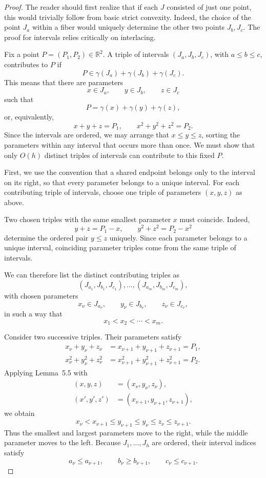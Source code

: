 \documentclass{amsart}
\numberwithin{equation}{section}
\begin{document}
\begin{proof}
The reader should first realize that if each $J$ consisted of just one point, this would trivially follow from basic strict convexity. Indeed, the choice of the point $J_a$ within a fiber would uniquely determine the other two points $J_b,J_c$. The proof for intervals relies critically on interlacing.

Fix a point $P=(P_1,P_2)\in\mathbb{R}^2$. A triple of intervals
$(J_a,J_b,J_c)$, with $a\le b\le c$, contributes to $P$ if
\[
    P\in\gamma(J_a)+\gamma(J_b)+\gamma(J_c).
\]
This means that there are parameters
\[
    x\in J_a,\qquad y\in J_b,\qquad z\in J_c
\]
such that
\[
    P=\gamma(x)+\gamma(y)+\gamma(z),
\]
or, equivalently,
\[
    x+y+z=P_1,\qquad x^2+y^2+z^2=P_2.
\]
Since the intervals are ordered, we may arrange that $x\le y\le z$,
sorting the parameters within any interval that occurs more than once.
We must show that only $O(h)$ distinct triples of intervals can
contribute to this fixed $P$.

First, we use the convention that a shared endpoint belongs only to the
interval on its right, so that every parameter belongs to a unique
interval. For each contributing triple of intervals, choose one triple
of parameters $(x,y,z)$ as above.

Two chosen triples with the same smallest parameter $x$ must coincide.
Indeed,
\[
    y+z=P_1-x,\qquad y^2+z^2=P_2-x^2
\]
determine the ordered pair $y\le z$ uniquely. Since each parameter
belongs to a unique interval, coinciding parameter triples come from
the same triple of intervals.

We can therefore list the distinct contributing triples as
\[
    (J_{a_1},J_{b_1},J_{c_1}),\ldots,
    (J_{a_m},J_{b_m},J_{c_m}),
\]
with chosen parameters
\[
    x_\nu\in J_{a_\nu},\qquad
    y_\nu\in J_{b_\nu},\qquad
    z_\nu\in J_{c_\nu},
\]
in such a way that
\[
    x_1<x_2<\cdots<x_m.
\]

Consider two successive triples. Their parameters satisfy
\[
\begin{aligned}
    x_\nu+y_\nu+z_\nu
    &=x_{\nu+1}+y_{\nu+1}+z_{\nu+1}=P_1,\\
    x_\nu^2+y_\nu^2+z_\nu^2
    &=x_{\nu+1}^2+y_{\nu+1}^2+z_{\nu+1}^2=P_2.
\end{aligned}
\]
Applying Lemma~5.5 with
\[
\begin{aligned}
    (x,y,z)&=(x_\nu,y_\nu,z_\nu),\\
    (x',y',z')&=(x_{\nu+1},y_{\nu+1},z_{\nu+1}),
\end{aligned}
\]
we obtain
\[
    x_\nu<x_{\nu+1}
    \le y_{\nu+1}\le y_\nu
    \le z_\nu\le z_{\nu+1}.
\]
Thus the smallest and largest parameters move to the right, while the
middle parameter moves to the left. Because $J_1,\ldots,J_h$ are
ordered, their interval indices satisfy
\[
    a_\nu\le a_{\nu+1},\qquad
    b_\nu\ge b_{\nu+1},\qquad
    c_\nu\le c_{\nu+1}.
\]


\end{proof}
\end{document}
